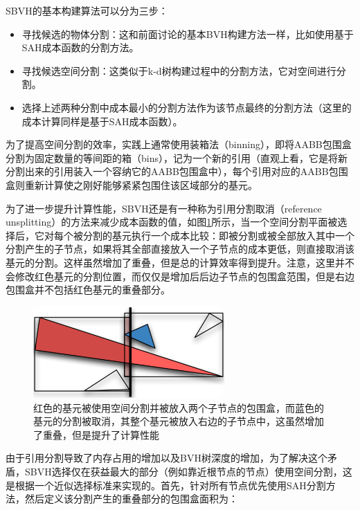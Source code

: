 SBVH的基本构建算法可以分为三步：

\begin{itemize}
	\item 寻找候选的物体分割：这和前面讨论的基本BVH构建方法一样，比如使用基于SAH成本函数的分割方法。
	\item 寻找候选空间分割：这类似于k-d树构建过程中的分割方法，它对空间进行分割。
	\item 选择上述两种分割中成本最小的分割方法作为该节点最终的分割方法（这里的成本计算同样是基于SAH成本函数）。
\end{itemize}

为了提高空间分割的效率，实践上通常使用装箱法（binning），即将AABB包围盒分割为固定数量的等间距的箱（bins），记为一个新的引用（直观上看，它是将新分割出来的引用装入一个容纳它的AABB包围盒中），每个引用对应的AABB包围盒则重新计算使之刚好能够紧紧包围住该区域部分的基元。

为了进一步提升计算性能，SBVH还是有一种称为引用分割取消（reference unsplitting）的方法来减少成本函数的值，如图\ref{f:pt-unsplitting}所示，当一个空间分割平面被选择后，它对每个被分割的基元执行一个成本比较：即被分割或被全部放入其中一个分割产生的子节点，如果将其全部直接放入一个子节点的成本更低，则直接取消该基元的分割。这样虽然增加了重叠，但是总的计算效率得到提升。注意，这里并不会修改红色基元的分割位置，而仅仅是增加后后边子节点的包围盒范围，但是右边包围盒并不包括红色基元的重叠部分。

\begin{figure}
	\sidecaption
	\includegraphics[width=0.65\textwidth]{figures/pt/unsplitting}
	\caption{红色的基元被使用空间分割并被放入两个子节点的包围盒，而蓝色的基元的分割被取消，其整个基元被放入右边的子节点中，这虽然增加了重叠，但是提升了计算性能}
	\label{f:pt-unsplitting}
\end{figure}

由于引用分割导致了内存占用的增加以及BVH树深度的增加，为了解决这个矛盾，SBVH选择仅在获益最大的部分（例如靠近根节点的节点）使用空间分割，这是根据一个近似选择标准来实现的。首先，针对所有节点优先使用SAH分割方法，然后定义该分割产生的重叠部分的包围盒面积为：

